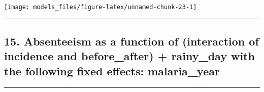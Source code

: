 \documentclass[]{article}
\begin{document}
\begin{center}\texttt{[image: models\_files/figure-latex/unnamed-chunk-23-1]} \end{center}

\newpage

\begin{center}\rule{0.5\linewidth}{\linethickness}\end{center}

\subsection{15. Absenteeism as a function of (interaction of incidence
and before\_after) + rainy\_day with the following fixed effects:
malaria\_year}\label{absenteeism-as-a-function-of-interaction-of-incidence-and-before_after-rainy_day-with-the-following-fixed-effects-malaria_year}

\begin{center}\rule{0.5\linewidth}{\linethickness}\end{center}
\end{document}
